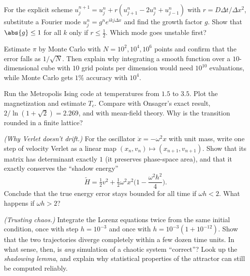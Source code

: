 \begin{problems}
 \label{prob:heat-stability} For the explicit scheme $u_j^{n+1} = u_j^n + r(u_{j+1}^n - 2u_j^n + u_{j-1}^n)$ with $r = D\Delta t/\Delta x^2$, substitute a Fourier mode $u_j^n = g^ne^{ikj\Delta x}$ and find the growth factor $g$. Show that $\abs{g}\le1$ for all $k$ only if $r\le\tfrac12$. Which mode goes unstable first?

 Estimate $\pi$ by Monte Carlo with $N = 10^2, 10^4, 10^6$ points and confirm that the error falls as $1/\sqrt N$. Then explain why integrating a smooth function over a $10$-dimensional cube with $10$ grid points per dimension would need $10^{10}$ evaluations, while Monte Carlo gets $1\%$ accuracy with $10^4$.

\core Run the Metropolis Ising code at temperatures from $1.5$ to $3.5$. Plot the magnetization and estimate $T_c$. Compare with Onsager's exact result, $2/\ln(1+\sqrt2) = 2.269$, and with mean-field theory. Why is the transition rounded in a finite lattice?

\core \label{prob:shadow} \emph{(Why Verlet doesn't drift.)} For the oscillator $\ddot x = -\omega^2x$ with unit mass, write one step of velocity Verlet as a linear map $(x_n,v_n)\mapsto(x_{n+1},v_{n+1})$. Show that its matrix has determinant exactly $1$ (it preserves phase-space area), and that it exactly conserves the ``shadow energy''
\[
  \tilde H = \tfrac12 v^2 + \tfrac12\omega^2x^2\Big(1 - \frac{\omega^2h^2}{4}\Big).
\]
Conclude that the true energy error stays bounded for all time if $\omega h<2$. What happens if $\omega h>2$?

 \emph{(Trusting chaos.)} Integrate the Lorenz equations twice from the same initial condition, once with step $h = 10^{-3}$ and once with $h = 10^{-3}(1+10^{-12})$. Show that the two trajectories diverge completely within a few dozen time units. In what sense, then, is \emph{any} simulation of a chaotic system ``correct''? Look up the \emph{shadowing lemma}, and explain why statistical properties of the attractor can still be computed reliably.
\end{problems}

\begin{reading}
\end{reading}

